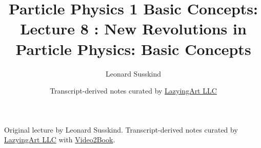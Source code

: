 \documentclass[11pt,oneside]{book}
\begin{document}
\frontmatter
\title{Particle Physics 1 Basic Concepts: Lecture 8 : New Revolutions in Particle Physics: Basic Concepts}
\author{Leonard Susskind}
\date{Transcript-derived notes curated by \href{https://lazying.art}{LazyingArt LLC}}
\maketitle
\begin{center}
\small Original lecture by Leonard Susskind. Transcript-derived notes curated by \href{https://lazying.art}{LazyingArt LLC} with \href{https://github.com/lachlanchen/Video2Book}{Video2Book}.
\end{center}
\clearpage
\mainmatter

\end{document}
